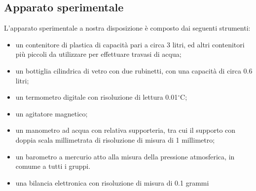 \subsection{Apparato sperimentale}

L'apparato sperimentale a nostra disposizione è composto dai seguenti strumenti:

\begin{itemize}
	\item{un contenitore di plastica di capacità pari a circa 3 litri, ed altri contenitori più piccoli da utilizzare per effettuare travasi di acqua;}
	\item{un bottiglia cilindrica di vetro con due rubinetti, con una capacità di circa 0.6 litri;}
	\item{un termometro digitale con risoluzione di lettura 0.01$^\circ$C;}
	\item{un agitatore magnetico;}
	\item{un manometro ad acqua con relativa supporteria, tra cui il supporto con doppia scala millimetrata di risoluzione di misura di 1 millimetro;}
	\item{un barometro a mercurio atto alla misura della pressione atmosferica, in comume a tutti i gruppi.}
	\item{una bilancia elettronica con risoluzione di misura di 0.1 grammi}
\end{itemize}
